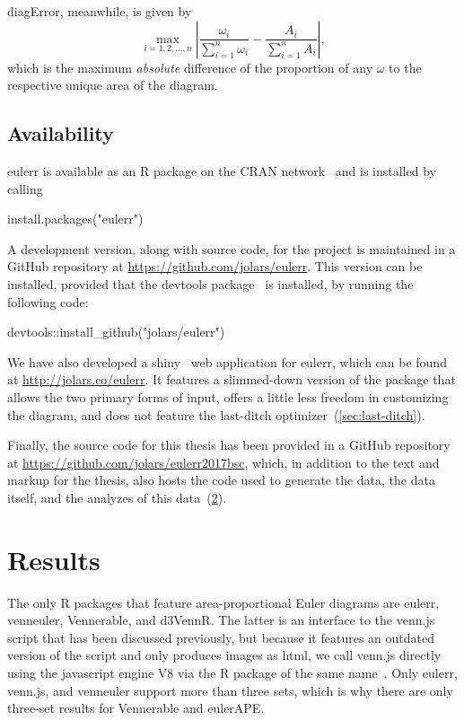 \documentclass[
  oneside,
  openany,
  numbers=noendperiod,
  parskip=half,
  bibliography=totoc
]{scrbook}\usepackage[]{graphicx}\usepackage{xcolor}
\newcommand{\proglang}[1]{\textsf{#1}}
\newcommand{\pkg}[1]{{\fontseries{b}\selectfont #1}}
\begin{document}
diagError, meanwhile, is given by
\begin{equation}
{\max_{i = 1, 2, \dots, n}}\left|
  \frac{\omega_i}{\sum_{i=1}^n \omega_i} - \frac{A_i}{\sum_{i=1}^n A_i} \right|,
\label{eq:diagError}
\end{equation}
which is the maximum \emph{absolute} difference of the proportion of any
$\omega$ to the respective unique area of the diagram.

\section{Availability}\label{sec:availability}

\pkg{eulerr} is available as an R package on the CRAN network~\citep{RCT_2017a}
and is installed by calling

install.packages("eulerr")

A development version, along with source code, for the project is maintained in
a GitHub repository at
\url{https://github.com/jolars/eulerr}. This version
can be installed, provided that the \pkg{devtools} package~\citep{Wickham_2017} is installed,
by running the following code:

devtools::install_github("jolars/eulerr")

We have also developed a \pkg{shiny}~\citep{Chang_2017} web application for
\pkg{eulerr}, which can be found at \url{http://jolars.co/eulerr}. It features
a slimmed-down version of the package that
allows the two primary forms of input, offers a little less freedom in customizing the
diagram, and does not feature the last-ditch optimizer~(\cref{sec:last-ditch}).

Finally, the source code for this thesis has been provided in a GitHub
repository at
\url{https://github.com/jolars/eulerr2017bsc}, which, in addition to the
text and markup for the thesis, also hosts the code used to generate the
data, the data itself, and the analyzes of this data~(\cref{ch:results}).

\chapter{Results}
\label{ch:results}

The only R packages that feature area-proportional Euler diagrams are
\pkg{eulerr}, \pkg{venneuler}, \pkg{Vennerable}, and \pkg{d3VennR}. The latter
is an interface to the \pkg{venn.js} script that has been discussed previously,
but because it features an outdated version of the script and only produces
images as \proglang{html}, we call \pkg{venn.js} directly using the \proglang{javascript}
engine \pkg{V8} via the R package of the same name~\citep{Ooms_2017}.
Only \pkg{eulerr}, \pkg{venn.js}, and \pkg{venneuler} support more than three
sets, which is why there are only three-set results for \pkg{Vennerable} and
\pkg{eulerAPE}.
\end{document}
